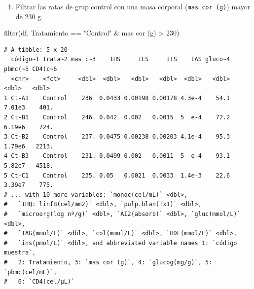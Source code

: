 \documentclass[
  a4paper,
]{scrreport}
\newenvironment{Shaded}{\begin{snugshade}}{\end{snugshade}}
\newcommand{\AttributeTok}[1]{\textcolor[rgb]{0.40,0.45,0.13}{#1}}
\newcommand{\DecValTok}[1]{\textcolor[rgb]{0.68,0.00,0.00}{#1}}
\newcommand{\FunctionTok}[1]{\textcolor[rgb]{0.28,0.35,0.67}{#1}}
\newcommand{\NormalTok}[1]{\textcolor[rgb]{0.00,0.23,0.31}{#1}}
\newcommand{\SpecialCharTok}[1]{\textcolor[rgb]{0.37,0.37,0.37}{#1}}
\newcommand{\StringTok}[1]{\textcolor[rgb]{0.13,0.47,0.30}{#1}}
\providecommand{\tightlist}{%
  \setlength{\itemsep}{0pt}\setlength{\parskip}{0pt}}\usepackage{longtable,booktabs,array}
\theoremstyle{definition}
\theoremstyle{definition}
\theoremstyle{remark}
\begin{document}
\begin{enumerate}
\def\labelenumi{\alph{enumi}.}
\setcounter{enumi}{3}
\tightlist
\item
  Filtrar las ratas de grup control con una masa corporal
  (\texttt{mas\ cor\ (g)}) mayor de 230 g.
\end{enumerate}

\begin{tcolorbox}[enhanced jigsaw, rightrule=.15mm, bottomrule=.15mm, opacitybacktitle=0.6, leftrule=.75mm, breakable, toptitle=1mm, left=2mm, colbacktitle=quarto-callout-note-color!10!white, colback=white, arc=.35mm, title=\textcolor{quarto-callout-note-color}{\faInfo}\hspace{0.5em}{Solución}, toprule=.15mm, colframe=quarto-callout-note-color-frame, bottomtitle=1mm, opacityback=0, coltitle=black, titlerule=0mm]

\begin{Shaded}
\begin{Highlighting}[]
\FunctionTok{filter}\NormalTok{(df, Tratamiento }\SpecialCharTok{==} \StringTok{"Control"} \SpecialCharTok{\&} \StringTok{\textasciigrave{}}\AttributeTok{mas cor (g)}\StringTok{\textasciigrave{}} \SpecialCharTok{\textgreater{}} \DecValTok{230}\NormalTok{)}
\end{Highlighting}
\end{Shaded}

\begin{verbatim}
# A tibble: 5 x 20
  código~1 Trata~2 mas c~3    IHS     IES     ITS    IAS gluco~4 pbmc(~5 CD4(c~6
  <chr>    <fct>     <dbl>  <dbl>   <dbl>   <dbl>  <dbl>   <dbl>   <dbl>   <dbl>
1 Ct-A1    Control    236  0.0433 0.00198 0.00178 4.3e-4    54.1  7.01e3    401.
2 Ct-B1    Control    246. 0.042  0.002   0.0015  5  e-4    72.2  6.19e6    724.
3 Ct-B2    Control    237. 0.0475 0.00238 0.00203 4.1e-4    95.3  1.79e6   2213.
4 Ct-B3    Control    231. 0.0499 0.002   0.0011  5  e-4    93.1  5.82e7   4518.
5 Ct-C1    Control    235. 0.05   0.0021  0.0033  1.4e-3    22.6  3.39e7    775.
# ... with 10 more variables: `monoc(cel/mL)` <dbl>,
#   `IHQ: linfB(cel/mm2)` <dbl>, `pulp.blan(Tx1)` <dbl>,
#   `microorg(log nº/g)` <dbl>, `AI2(absorb)` <dbl>, `gluc(mmol/L)` <dbl>,
#   `TAG(mmol/L)` <dbl>, `col(mmol/L)` <dbl>, `HDL(mmol/L)` <dbl>,
#   `ins(pmol/L)` <dbl>, and abbreviated variable names 1: `código muestra`,
#   2: Tratamiento, 3: `mas cor (g)`, 4: `glucog(mg/g)`, 5: `pbmc(cel/mL)`,
#   6: `CD4(cel/µL)`
\end{verbatim}

\end{tcolorbox}
\end{document}
